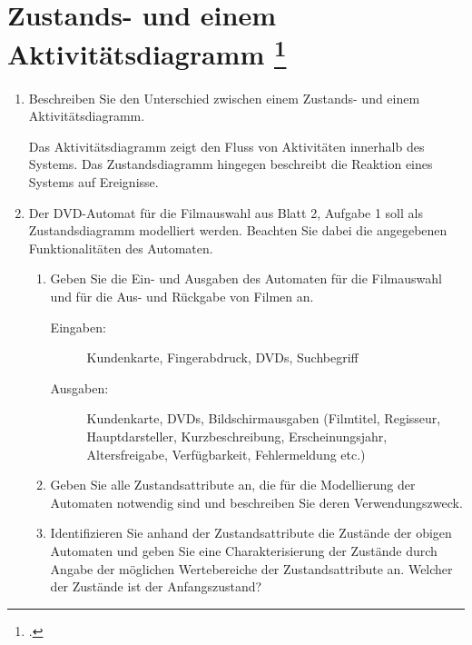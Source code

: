 \documentclass{bschlangaul-aufgabe}
\begin{document}

\section{Zustands- und einem Aktivitätsdiagramm
\footcite{sosy:ab:3}}

\begin{enumerate}
\item Beschreiben Sie den Unterschied zwischen einem Zustands- und einem
Aktivitätsdiagramm.

\begin{liAntwort}
Das Aktivitätsdiagramm zeigt den Fluss von Aktivitäten innerhalb des
Systems. Das Zustandsdiagramm hingegen beschreibt die Reaktion eines
Systems auf Ereignisse.
\end{liAntwort}

\item Der DVD-Automat für die Filmauswahl aus Blatt 2, Aufgabe 1 soll
als Zustandsdiagramm modelliert werden. Beachten Sie dabei die
angegebenen Funktionalitäten des Automaten.

\begin{enumerate}
\item Geben Sie die Ein- und Ausgaben des Automaten für die Filmauswahl
und für die Aus- und Rückgabe von Filmen an.

\begin{liAntwort}
\begin{description}
\item[Eingaben:]

Kundenkarte, Fingerabdruck, DVDs, Suchbegriff

\item[Ausgaben:]

Kundenkarte, DVDs, Bildschirmausgaben (Filmtitel, Regisseur,
Hauptdarsteller, Kurzbeschreibung, Erscheinungsjahr, Altersfreigabe,
Verfügbarkeit, Fehlermeldung etc.)
\end{description}
\end{liAntwort}

\item Geben Sie alle Zustandsattribute an, die für die Modellierung der
Automaten notwendig sind und beschreiben Sie deren Verwendungszweck.

\item Identifizieren Sie anhand der Zustandsattribute die Zustände der
obigen Automaten und geben Sie eine Charakterisierung der Zustände durch
Angabe der möglichen Wertebereiche der Zustandsattribute an. Welcher der
Zustände ist der Anfangszustand?


\end{enumerate}
\end{enumerate}
\end{document}
